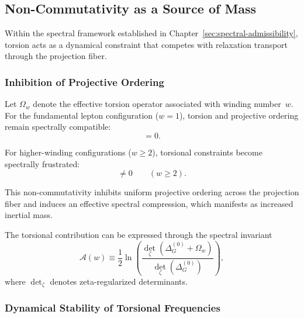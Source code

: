 \subsection{Non-Commutativity as a Source of Mass}
  \label{sec:noncommutativity-mass}

  Within the spectral framework established in Chapter~\ref{sec:spectral-admissibility},
  torsion acts as a dynamical constraint that competes with
  relaxation transport through the projection fiber.

  \subsubsection*{Inhibition of Projective Ordering}
    \label{sec:inhibition-relaxation}

    Let $\Omega_w$ denote the effective torsion operator associated
    with winding number~$w$.
    For the fundamental lepton configuration ($w=1$),
    torsion and projective ordering remain spectrally compatible:
    \begin{equation}
      [\Delta^{(0)}_G,\Omega_{1}] = 0 .
    \end{equation}

    For higher-winding configurations ($w\ge 2$), torsional constraints
    become spectrally frustrated:
    \begin{equation}
      [\Delta^{(0)}_G,\Omega_{w}] \neq 0
      \qquad (w\ge 2).
    \end{equation}

    This non-commutativity inhibits uniform projective ordering across the
    projection fiber and induces an effective spectral compression,
    which manifests as increased inertial mass.

    The torsional contribution can be expressed through the spectral
    invariant
    \begin{equation}
      \mathcal{A}(w) \equiv
      \frac12 \ln\!\left(
                     \frac{\det_\zeta(\Delta^{(0)}_G+\Omega_{w})}
                     {\det_\zeta(\Delta^{(0)}_G)}
      \right),
      \label{eq:Aw-fredholm}
    \end{equation}
    where $\det_\zeta$ denotes zeta-regularized determinants.

  \subsubsection*{Dynamical Stability of Torsional Frequencies}
    \label{sec:pisano-ratio}

